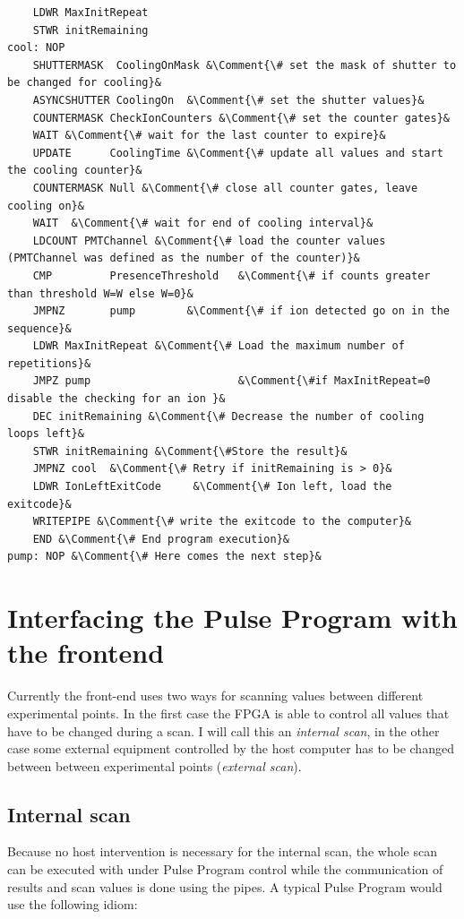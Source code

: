 \documentclass[11pt]{scrartcl}
\begin{document}
\begin{lstlisting}
	LDWR MaxInitRepeat
	STWR initRemaining
cool: NOP
	SHUTTERMASK  CoolingOnMask &\Comment{\# set the mask of shutter to be changed for cooling}&
	ASYNCSHUTTER CoolingOn  &\Comment{\# set the shutter values}&
	COUNTERMASK CheckIonCounters &\Comment{\# set the counter gates}&
	WAIT &\Comment{\# wait for the last counter to expire}&
	UPDATE      CoolingTime &\Comment{\# update all values and start the cooling counter}&
	COUNTERMASK Null &\Comment{\# close all counter gates, leave cooling on}&
	WAIT  &\Comment{\# wait for end of cooling interval}&
	LDCOUNT	PMTChannel &\Comment{\# load the counter values (PMTChannel was defined as the number of the counter)}&
	CMP      	PresenceThreshold 	&\Comment{\# if counts greater than threshold W=W else W=0}&
	JMPNZ     	pump  		&\Comment{\# if ion detected go on in the sequence}&
	LDWR MaxInitRepeat &\Comment{\# Load the maximum number of repetitions}&
	JMPZ pump                       &\Comment{\#if MaxInitRepeat=0 disable the checking for an ion }&
	DEC initRemaining &\Comment{\# Decrease the number of cooling loops left}&
	STWR initRemaining &\Comment{\#Store the result}&
	JMPNZ cool  &\Comment{\# Retry if initRemaining is > 0}&
	LDWR IonLeftExitCode     &\Comment{\# Ion left, load the exitcode}&
	WRITEPIPE &\Comment{\# write the exitcode to the computer}&
	END &\Comment{\# End program execution}&
pump: NOP &\Comment{\# Here comes the next step}&
\end{lstlisting}


\section{Interfacing the Pulse Program with the frontend}
Currently the front-end uses two ways for scanning values between different experimental points. In the first case the FPGA is able to control all values that have to be changed during a scan. I will call this an {\em internal scan}, in the other case some external equipment controlled by the host computer has to be changed between between experimental points ({\em external scan}).

\subsection{Internal scan}
Because no host intervention is necessary for the internal scan, the whole scan can be executed with under Pulse Program control while the communication of results and scan values is done using the pipes. A typical Pulse Program would use the following idiom:
\end{document}
